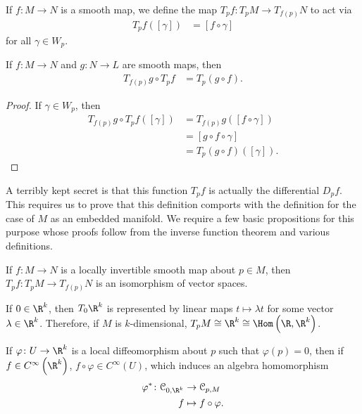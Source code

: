 \documentclass[10pt]{mypackage}
\begin{document}
\begin{definition}
  If $f\colon M\rightarrow N$ is a smooth map, we define the map $T_pf\colon T_pM\rightarrow T_{f(p)}N$ to act via
  \begin{align*}
    T_pf\left( \left[ \gamma \right] \right) &= \left[ f\circ\gamma \right]
  \end{align*}
  for all $\gamma\in W_{p}$.
\end{definition}
\begin{proposition}
  If $f\colon M\rightarrow N$ and $g\colon N\rightarrow L$ are smooth maps, then
  \begin{align*}
    T_{f(p)}g\circ T_pf &= T_{p}\left( g\circ f \right).
  \end{align*}
\end{proposition}
\begin{proof}
  If $\gamma\in W_{p}$, then
  \begin{align*}
    T_{f(p)}g\circ T_{p}f\left( \left[ \gamma \right] \right) &= T_{f(p)}g\left( \left[ f\circ \gamma \right] \right)\\
                                                              &= \left[ g\circ f \circ \gamma \right]\\
                                                              &= T_{p}\left( g\circ f \right)\left( \left[ \gamma \right] \right).
  \end{align*}
\end{proof}
A terribly kept secret is that this function $T_pf$ is actually the differential $D_pf$. This requires us to prove that this definition comports with the definition for the case of $M$ as an embedded manifold. We require a few basic propositions for this purpose whose proofs follow from the inverse function theorem and various definitions.
\begin{proposition}
  If $f\colon M\rightarrow N$ is a locally invertible smooth map about $p\in M$, then $T_{p}f\colon T_pM\rightarrow T_{f(p)}N$ is an isomorphism of vector spaces.
\end{proposition}
\begin{proposition}
  If $0\in \R^{k}$, then $T_0\R^{k}$ is represented by linear maps $t\mapsto \lambda t$ for some vector $\lambda\in \R^{k}$. Therefore, if $M$ is $k$-dimensional, $T_pM\cong \R^{k}\cong \Hom\left( \R,\R^{k} \right)$.
\end{proposition}
\begin{proposition}
  If $\varphi\colon U\rightarrow \R^{k}$ is a local diffeomorphism about $p$ such that $\varphi(p) = 0$, then if $f\in C^{\infty}\left( \R^{k} \right)$, $f\circ\varphi\in C^{\infty}\left( U \right)$, which induces an algebra homomorphism 
  \begin{align*}
    \varphi^{\ast}\colon \mathcal{C}_{0,\R^{k}}&\rightarrow \mathcal{C}_{p,M}\\
    f &\mapsto f\circ\varphi.
  \end{align*}
\end{proposition}
\end{document}
